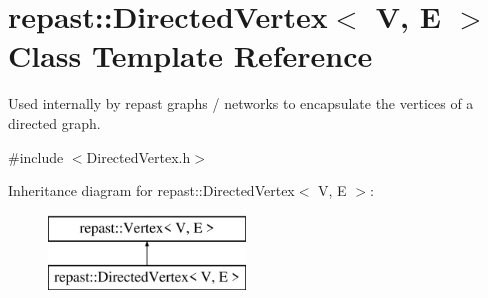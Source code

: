\hypertarget{classrepast_1_1_directed_vertex}{\section{repast\-:\-:Directed\-Vertex$<$ V, E $>$ Class Template Reference}
\label{classrepast_1_1_directed_vertex}
}


Used internally by repast graphs / networks to encapsulate the vertices of a directed graph.  




{\ttfamily \#include $<$Directed\-Vertex.\-h$>$}

Inheritance diagram for repast\-:\-:Directed\-Vertex$<$ V, E $>$\-:\begin{figure}[H]
\begin{center}
\leavevmode
\includegraphics[height=2.000000cm]{classrepast_1_1_directed_vertex}
\end{center}
\end{figure}
